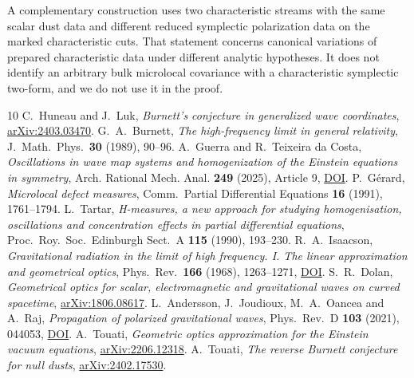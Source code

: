 \documentclass[11pt]{article}
\begin{document}
A complementary construction uses two characteristic streams with the same scalar dust data and different reduced symplectic polarization data on the marked characteristic cuts. That statement concerns canonical variations of prepared characteristic data under different analytic hypotheses. It does not identify an arbitrary bulk microlocal covariance with a characteristic symplectic two-form, and we do not use it in the proof.

\begin{thebibliography}{10}
 C.~Huneau and J.~Luk, \emph{Burnett's conjecture in generalized wave coordinates}, \href{https://arxiv.org/abs/2403.03470}{arXiv:2403.03470}.
 G.~A.~Burnett, \emph{The high-frequency limit in general relativity}, J.\ Math.\ Phys.\ \textbf{30} (1989), 90--96.
 A.~Guerra and R.~Teixeira da Costa, \emph{Oscillations in wave map systems and homogenization of the Einstein equations in symmetry}, Arch. Rational Mech. Anal. \textbf{249} (2025), Article 9, \href{https://doi.org/10.1007/s00205-024-02042-3}{DOI}.
 P.~G\'erard, \emph{Microlocal defect measures}, Comm.\ Partial Differential Equations \textbf{16} (1991), 1761--1794.
 L.~Tartar, \emph{H-measures, a new approach for studying homogenisation, oscillations and concentration effects in partial differential equations}, Proc.\ Roy.\ Soc.\ Edinburgh Sect.\ A \textbf{115} (1990), 193--230.
 R.~A.~Isaacson, \emph{Gravitational radiation in the limit of high frequency. I. The linear approximation and geometrical optics}, Phys.\ Rev.\ \textbf{166} (1968), 1263--1271, \href{https://doi.org/10.1103/PhysRev.166.1263}{DOI}.
 S.~R.~Dolan, \emph{Geometrical optics for scalar, electromagnetic and gravitational waves on curved spacetime}, \href{https://arxiv.org/abs/1806.08617}{arXiv:1806.08617}.
 L.~Andersson, J.~Joudioux, M.~A.~Oancea and A.~Raj, \emph{Propagation of polarized gravitational waves}, Phys.\ Rev.\ D \textbf{103} (2021), 044053, \href{https://doi.org/10.1103/PhysRevD.103.044053}{DOI}.
 A.~Touati, \emph{Geometric optics approximation for the Einstein vacuum equations}, \href{https://arxiv.org/abs/2206.12318}{arXiv:2206.12318}.
 A.~Touati, \emph{The reverse Burnett conjecture for null dusts}, \href{https://arxiv.org/abs/2402.17530}{arXiv:2402.17530}.
\end{thebibliography}
\end{document}
